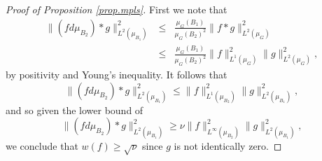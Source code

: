 \documentclass[12pt]{amsart}
\numberwithin{equation}{section}
\theoremstyle{plain}
\theoremstyle{definition}
\renewcommand{\leq}{\leqslant}
\renewcommand{\geq}{\geqslant}
\begin{document}
\begin{proof}[Proof of Proposition \ref{prop.mpls}]
First we note that
\begin{eqnarray*}
\|(fd\mu_{B_2}) \ast g \|_{L^2(\mu_{B_1})}^2&\leq& \frac{\mu_G({B_1})}{\mu_G(B_2)^2}\|f \ast g\|_{L^2(\mu_G)}^2 \\ &\leq &\frac{\mu_G({B_1})}{\mu_G(B_2)^2}\|f\|_{L^1(\mu_G)}^2\|g\|_{L^2(\mu_G)}^2,
\end{eqnarray*}
by positivity and Young's inequality.  It follows that
\begin{equation*}
\|(fd\mu_{B_2}) \ast g \|_{L^2(\mu_{B_1})}^2 \leq \|f\|_{L^1(\mu_{B_2})}^2\|g\|_{L^2(\mu_{B_1})}^2,
\end{equation*}
and so given the lower bound of
\begin{equation*}
\|(fd\mu_{B_2}) \ast g \|_{L^2(\mu_{B_1})}^2 \geq \nu \|f\|_{L^\infty(\mu_{B_2})}^2\|g\|_{L^2(\mu_{B_1})}^2,
\end{equation*}
we conclude that $w(f)\geq \sqrt{\nu}$ since $g$ is not identically zero.


\end{proof}
\end{document}
